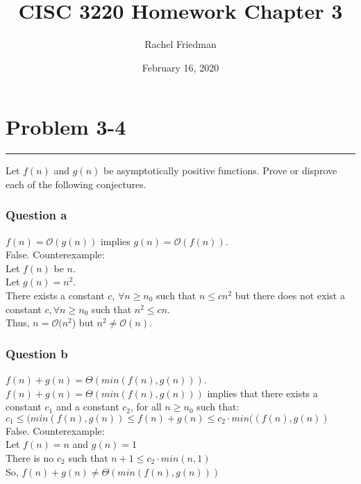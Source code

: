 \documentclass[11pt]{article}
\title{CISC 3220 Homework Chapter 3}
\author{Rachel Friedman}
\date{February 16, 2020}
\begin{document}
\maketitle

\section*{Problem 3-4}\nointerlineskip
\noindent \rule{\linewidth}{0.01pt}
Let $f(n)$ and $g(n)$ be asymptotically positive functions. Prove or disprove each of the following conjectures.\\

\subsubsection*{Question a}

$f(n) = \mathcal{O}(g(n))$ implies $g(n) = \mathcal{O}(f(n))$.\\

False. Counterexample:\\[6pt]
\indent \indent Let $f(n)$ be $n$.\\[6pt]
\indent \indent Let $g(n) = n^2$.\\[6pt]
\indent \indent There exists a constant $c, \hspace{2pt} \forall n \geq n_0$ such that $n \leq c n^2$ but there does not exist a constant $c, \forall n \geq n_0$ such that $n^2 \leq c n$.\\[6pt]
\indent \indent Thus, $ n = \mathcal{O}(n^2$) but $n^2 \neq \mathcal{O}(n)$. \\

\subsubsection*{Question b}

$f(n) + g(n) = \Theta(min(f(n),g(n)))$.\\


\indent \indent$f(n) + g(n) = \Theta(min(f(n),g(n)))$ implies that there exists a constant $c_1$ and a constant $c_2$, for all $n \geq n_0$ such that: \\[2pt]
\indent \indent$ c_1 \leq (min(f(n),g(n)) \leq f(n) + g(n) \leq c_2 \cdot min((f(n),g(n))$\\[6pt]
\indent False. Counterexample: \\[6pt]
\indent \indent Let $f(n) = n $ and $g(n) = 1$\\[6pt]
\indent \indent There is no $c_2$ such that  $n+1 \leq c_2 \cdot min(n,1)$\\[6pt]
\indent \indent So, $f(n) + g(n) \neq \Theta(min(f(n),g(n)))$\\[6pt]
\newpage
\end{document}
